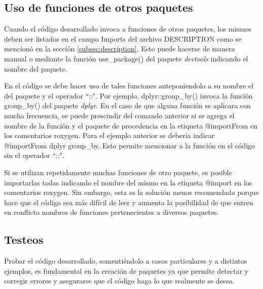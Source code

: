 \subsection{Uso de funciones de otros paquetes}
Cuando el código desarrollado invoca a funciones de otros paquetes, los mismos deben ser listados en el campo Imports del archivo DESCRIPTION como se mencionó en la sección \ref{subsec:description}. Esto puede hacerse de manera manual o mediante la función \textcolor{fandango}{use\_package()} del paquete \emph{devtools} indicando el nombre del paquete.

En el código se debe hacer uso de tales funciones anteponiendolo a su nombre el del paquete y el operador ``::". Por ejemplo, \textcolor{fandango}{dplyr::group\_by()} invoca la función \textcolor{fandango}{group\_by()} del paquete \emph{dplyr}. En el caso de que alguna función se aplicara con mucha frecuencia, se puede prescindir del comando anterior si se agrega el nombre de la función y el paquete de procedencia en la etiqueta \textcolor{fandango}{@importFrom} en los comentarios roxygen. Para el ejemplo anterior se debería indicar \textcolor{fandango}{@importFrom dplyr group\_by}. Esto permite mencionar a la función en el código sin el operador ``::".

Si se utilizan repetidamente muchas funciones de otro paquete, es posible importarlas todas indicando el nombre del mismo en la etiqueta \textcolor{fandango}{@import} en los comentarios roxygen. Sin embargo, esta es la solución menos recomendada porque hace que el código sea más difícil de leer y aumenta la posibilidad de que entren en conflicto nombres de funciones pertenecientes a diversos paquetes.

\subsection{Testeos}

Probar el código desarrollado, somentiéndolo a casos particulares y a distintos ejemplos, es fundamental en la creación de paquetes ya que permite detectar y corregir errores y asegurarse que el código haga lo que realmente se desea.

